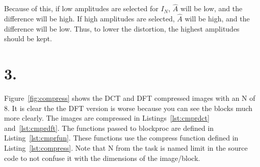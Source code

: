 Because of this, if low amplitudes are selected for \(I_N\), \(\hat{A}\) will be low, and the difference will be high.
If high amplitudes are selected, \(\hat{A}\) will be high, and the difference will be low.
Thus, to lower the distortion, the highest amplitudes should be kept.

\section*{3.}
Figure~\ref{fig:compress} shows the DCT and DFT compressed images with an N of 8.
It is clear the the DFT version is worse because you can see the blocks much more clearly.
The images are compressed in Listings~\ref{lst:cmprdct} and~\ref{lst:cmprdft}.
The functions passed to blockproc are defined in Listing~\ref{lst:cmprfun}.
These functions use the compress function defined in Listing~\ref{lst:compress}.
Note that N from the task is named limit in the source code to not confuse it with the dimensions of the image/block.

